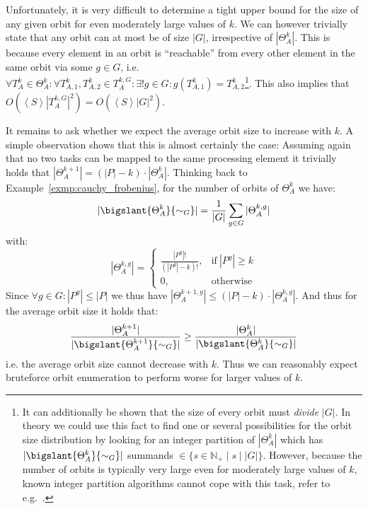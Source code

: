 \noindent
Unfortunately, it is very difficult to determine a tight upper bound for the
size of any given orbit for even moderately large values of $k$. We can however
trivially state that any orbit can at most be of size $|G|$, irrespective of
$|\Theta_A^k|$. This is because every element in an orbit is ``reachable'' from
every other element in the same orbit via some $g \in G$, i.e. $\forall T_A^k
\in \Theta_A^k: \forall T_{A,1}^k, T_{A,2}^k \in T_A^{k,G}: \exists! g \in G:
g(T_{A,1}^k) = T_{A,2}^k$\footnote{It can additionally be shown that the size
of every orbit must \textit{divide} $|G|$. In theory we could use this fact to
find one or several possibilities for the orbit size distribution by looking
for an integer partition of $|\Theta_A^k|$ which has
$|\bigslant{\Theta_A^k}{\sim_G}|$ summands $\in \{s \in \mathbb{N}_+ \mid s
\mid |G|\}$.  However, because the number of orbits is typically very large
even for moderately large values of $k$, known integer partition algorithms
cannot cope with this task, refer to e.g.~\cite{Zoghbi}.}. This also implies that
$O(\left<S\right> |T_A^{k,G}|^2) = O(\left<S\right> |G|^2)$.

It remains to ask whether we expect the average orbit size to increase with
$k$. A simple observation shows that this is almost certainly the case:
Assuming again that no two tasks can be mapped to the same processing element
it trivially holds that $|\Theta_A^{k+1}| = (|P| - k) \cdot |\Theta_A^k|$.
Thinking back to Example~\ref{exmp:cauchy_frobenius}, for the number of orbits
of $\Theta_A^k$ we have:
%
\begin{equation*}
 |\bigslant{\Theta_A^k}{\sim_G}| =
 \frac{1}{|G|} \sum_{g \in G} |\Theta_A^{k,g}|
\end{equation*}
%
with:
%
\begin{equation*}
 |\Theta_A^{k,g}| =
 \begin{cases}
   \frac{|P^g|!}{(|P^g| - k)!}, &\text{if}\ |P^g| \geq k\\
   0,                           &\text{otherwise}
 \end{cases}
\end{equation*}
%
Since $\forall g \in G: |P^g| \leq |P|$ we thus have
$|\Theta_A^{k+1,g}| \leq (|P| - k) \cdot |\Theta_{A}^{k,g}|$. And thus
for the average orbit size it holds that:
%
\begin{equation*}
  \frac{|\Theta_A^{k+1}|}{|\bigslant{\Theta_A^{k+1}}{\sim_G}|}
    \geq
  \frac{|\Theta_A^k|}{|\bigslant{\Theta_A^k}{\sim_G}|}
\end{equation*}
%
i.e. the average orbit size cannot decrease with $k$. Thus we can reasonably
expect bruteforce orbit enumeration to perform worse for larger
values of $k$.

